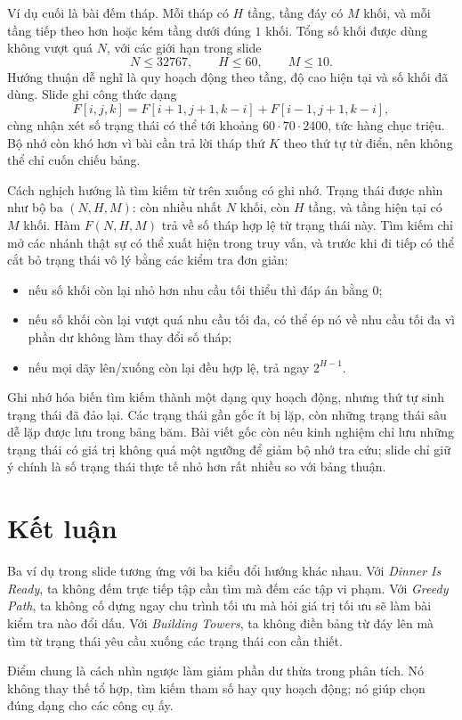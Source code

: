 \documentclass[11pt]{article}
\begin{document}
Ví dụ cuối là bài đếm tháp. Mỗi tháp có \(H\) tầng, tầng đáy có \(M\) khối,
và mỗi tầng tiếp theo hơn hoặc kém tầng dưới đúng \(1\) khối. Tổng số khối
được dùng không vượt quá \(N\), với các giới hạn trong slide
\[
  N\le 32767,\qquad H\le 60,\qquad M\le 10.
\]
Hướng thuận dễ nghĩ là quy hoạch động theo tầng, độ cao hiện tại và số khối
đã dùng. Slide ghi công thức dạng
\[
  F[i,j,k]=F[i+1,j+1,k-i]+F[i-1,j+1,k-i],
\]
cùng nhận xét số trạng thái có thể tới khoảng \(60\cdot70\cdot2400\), tức
hàng chục triệu. Bộ nhớ còn khó hơn vì bài cần trả lời tháp thứ \(K\) theo
thứ tự từ điển, nên không thể chỉ cuốn chiếu bảng.

Cách nghịch hướng là tìm kiếm từ trên xuống có ghi nhớ. Trạng thái được nhìn
như bộ ba \((N,H,M)\): còn nhiều nhất \(N\) khối, còn \(H\) tầng, và tầng hiện
tại có \(M\) khối. Hàm \(F(N,H,M)\) trả về số tháp hợp lệ từ trạng thái này.
Tìm kiếm chỉ mở các nhánh thật sự có thể xuất hiện trong truy vấn, và trước
khi đi tiếp có thể cắt bỏ trạng thái vô lý bằng các kiểm tra đơn giản:
\begin{itemize}
  \item nếu số khối còn lại nhỏ hơn nhu cầu tối thiểu thì đáp án bằng \(0\);
  \item nếu số khối còn lại vượt quá nhu cầu tối đa, có thể ép nó về nhu cầu
  tối đa vì phần dư không làm thay đổi số tháp;
  \item nếu mọi dãy lên/xuống còn lại đều hợp lệ, trả ngay \(2^{H-1}\).
\end{itemize}

Ghi nhớ hóa biến tìm kiếm thành một dạng quy hoạch động, nhưng thứ tự sinh
trạng thái đã đảo lại. Các trạng thái gần gốc ít bị lặp, còn những trạng thái
sâu dễ lặp được lưu trong bảng băm. Bài viết gốc còn nêu kinh nghiệm chỉ lưu
những trạng thái có giá trị không quá một ngưỡng để giảm bộ nhớ tra cứu; slide
chỉ giữ ý chính là số trạng thái thực tế nhỏ hơn rất nhiều so với bảng thuận.

\section{Kết luận}

Ba ví dụ trong slide tương ứng với ba kiểu đổi hướng khác nhau. Với
\textit{Dinner Is Ready}, ta không đếm trực tiếp tập cần tìm mà đếm các tập
vi phạm. Với \textit{Greedy Path}, ta không cố dựng ngay chu trình tối ưu mà
hỏi giá trị tối ưu sẽ làm bài kiểm tra nào đổi dấu. Với \textit{Building
Towers}, ta không điền bảng từ đáy lên mà tìm từ trạng thái yêu cầu xuống các
trạng thái con cần thiết.

Điểm chung là cách nhìn ngược làm giảm phần dư thừa trong phân tích. Nó không
thay thế tổ hợp, tìm kiếm tham số hay quy hoạch động; nó giúp chọn đúng dạng
cho các công cụ ấy.
\end{document}
